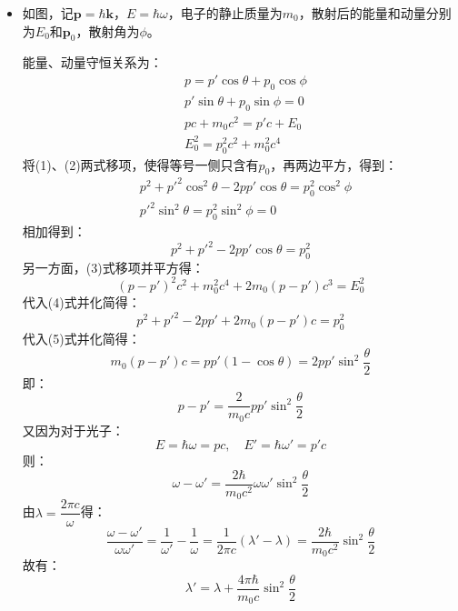 \documentclass[a4paper,fontset=none]{ctexart}
\begin{document}
\begin{itemize}
    \item[26.]
    如图，记$\bm{p}=\hbar\bm{k}$，$E=\hbar\omega$，电子的静止质量为$m_0$，散射后的能量和动量分别为$E_0$和$\bm{p}_0$，散射角为$\phi$。

    \begin{center}
    \end{center}

    能量、动量守恒关系为：
    \begin{align}
        &p = p'\cos\theta + p_0\cos\phi \\
        &p'\sin\theta + p_0\sin\phi = 0 \\
        &pc + m_0c^2 = p'c + E_0 \\
        &E_0^2 = p_0^2c^2 + m_0^2c^4
    \end{align}
    将(1)、(2)两式移项，使得等号一侧只含有$p_0$，再两边平方，得到：
    \begin{align*}
        &p^2 + p'^2\cos^2\theta - 2pp'\cos\theta = p_0^2\cos^2\phi \\
        &{p'}^2\sin^2\theta = p_0^2\sin^2\phi = 0
    \end{align*}
    相加得到：
    \begin{equation}
        p^2 + {p'}^2 - 2pp'\cos\theta = p_0^2
    \end{equation}
    另一方面，(3)式移项并平方得：
    \[
        (p-p')^2c^2 + m_0^2c^4 + 2m_0(p-p')c^3 = E_0^2
    \]
    代入(4)式并化简得：
    \[
        p^2 + p'^2 - 2pp' + 2m_0(p-p')c = p_0^2
    \]
    代入(5)式并化简得：
    \[
        m_0(p-p')c = pp'(1-\cos\theta) = 2pp'\sin^2\frac{\theta}{2}
    \]
    即：
    \[
        p - p' = \frac{2}{m_0c}pp'\sin^2\frac{\theta}{2}
    \]
    又因为对于光子：
    \[
        E = \hbar\omega = pc,\quad E' = \hbar\omega' = p'c
    \]
    则：
    \[
        \omega - \omega' = \frac{2\hbar}{m_0c^2}\omega\omega'\sin^2\frac{\theta}{2}
    \]
    由$\lambda=\dfrac{2\pi c}{\omega}$得：
    \[
        \frac{\omega - \omega'}{\omega\omega'} = \frac{1}{\omega'} - \frac{1}{\omega} = \frac{1}{2\pi c}(\lambda' - \lambda) = \frac{2\hbar}{m_0c^2}\sin^2\frac{\theta}{2}
    \]
    故有：
    \[
        \lambda' = \lambda + \frac{4\pi\hbar}{m_0c}\sin^2\frac{\theta}{2}
    \]

\end{itemize}
\end{document}
